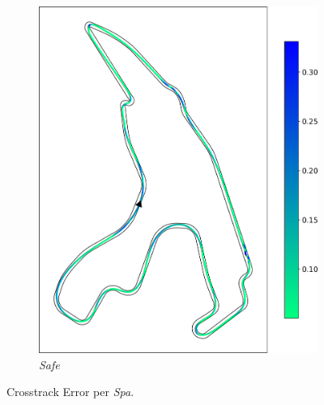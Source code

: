 \begin{figure}[H]
\begin{subfigure}[b]{0.366\textwidth}
        \includegraphics[width=\textwidth]{images/spa_mpc_safe_crosstrack.png}
        \caption{\textit{Safe}}
        \label{fig:tracking_safe_spa}
    \end{subfigure}
    \caption{Crosstrack Error per \textit{Spa}.}
    \label{fig:fig18} %
\end{figure}
